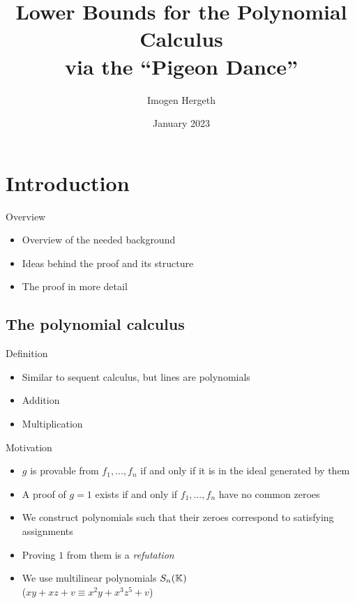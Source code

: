 \documentclass[xcolor={dvipsnames}, aspectratio=169, handout]{beamer}
\title{Lower Bounds for the Polynomial Calculus\\via the ``Pigeon Dance''}
\author{Imogen Hergeth}
\date{January 2023}
\newcommand{\Sn}{S_n(\KK)}
\begin{document}
\maketitle

\section{Introduction}
\begin{frame}{Overview}
    \begin{itemize}[<+->]
        \item Overview of the needed background
        \item Ideas behind the proof and its structure
        \item The proof in more detail
    \end{itemize}
\end{frame}

\subsection{The polynomial calculus}
\begin{frame}{Definition}
    \begin{itemize}[<+->]
        \item Similar to sequent calculus, but lines are polynomials
        \item Addition
        \begin{prooftree}
        \end{prooftree}
        \item Multiplication
        \begin{prooftree}
        \end{prooftree}
    \end{itemize}
\end{frame}

\begin{frame}{Motivation}
    \begin{itemize}[<+->]
        \item $g$ is provable from $f_1, \ldots, f_n$ if and only if it is in the ideal generated by them
        \item A proof of $g=1$ exists if and only if $f_1, \ldots, f_n$ have no common zeroes
        \item We construct polynomials such that their zeroes correspond to satisfying assignments
        \item Proving $1$ from them is a \textit{refutation}
        \item We use multilinear polynomials $\Sn$\\
            ($xy + xz + v \equiv x^2y + x^3z^5 + v$)
    \end{itemize}
\end{frame}
\end{document}
